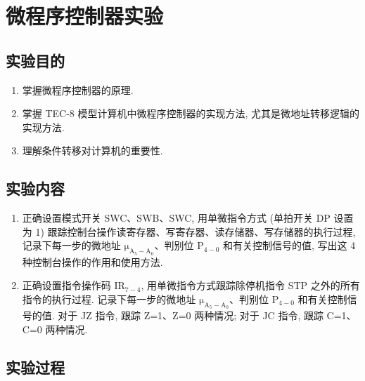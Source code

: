 \documentclass[../main.tex]{subfiles}
\begin{document}
\setcounter{chapter}{3}

\chapter{微程序控制器实验}

\section{实验目的}

\begin{enumerate}

    \item 掌握微程序控制器的原理.

    \item 掌握 TEC-8 模型计算机中微程序控制器的实现方法, 尤其是微地址转移逻辑的实现方法.

    \item 理解条件转移对计算机的重要性.

\end{enumerate}

\section{实验内容}

\begin{enumerate}

    \item 正确设置模式开关 SWC、SWB、SWC, 用单微指令方式 (单拍开关 DP 设置为 1) 跟踪控制台操作读寄存器、写寄存器、读存储器、写存储器的执行过程, 记录下每一步的微地址 $\mathrm{\mu_{A_{5}-A_{0}}}$、判别位 P$_{4-0}$ 和有关控制信号的值, 写出这 4 种控制台操作的作用和使用方法.

    \item 正确设置指令操作码 IR$_{7-4}$, 用单微指令方式跟踪除停机指令 STP 之外的所有指令的执行过程. 记录下每一步的微地址 $\mathrm{\mu_{A_{5}-A_{0}}}$、判别位 P$_{4-0}$ 和有关控制信号的值. 对于 JZ 指令, 跟踪 Z=1、Z=0 两种情况; 对于 JC 指令, 跟踪 C=1、C=0 两种情况.

\end{enumerate}

\section{实验过程}
\end{document}
